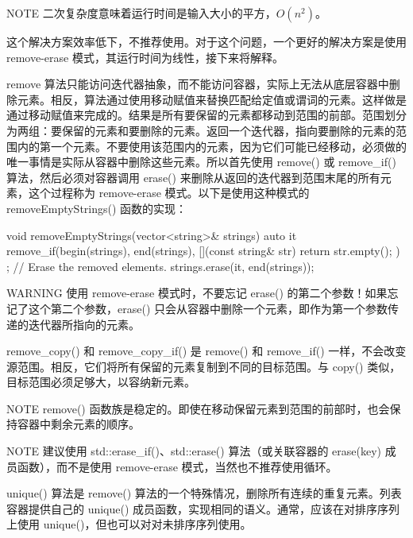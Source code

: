 \begin{myNotic}{NOTE}
二次复杂度意味着运行时间是输入大小的平方，$O(n^2)$。
\end{myNotic}

这个解决方案效率低下，不推荐使用。对于这个问题，一个更好的解决方案是使用 remove-erase 模式，其运行时间为线性，接下来将解释。

remove 算法只能访问迭代器抽象，而不能访问容器，实际上无法从底层容器中删除元素。相反，算法通过使用移动赋值来替换匹配给定值或谓词的元素。这样做是通过移动赋值来完成的。结果是所有要保留的元素都移动到范围的前部。范围划分为两组：要保留的元素和要删除的元素。返回一个迭代器，指向要删除的元素的范围内的第一个元素。不要使用该范围内的元素，因为它们可能已经移动，必须做的唯一事情是实际从容器中删除这些元素。所以首先使用 remove() 或 remove\_if() 算法，然后必须对容器调用 erase() 来删除从返回的迭代器到范围末尾的所有元素，这个过程称为 remove-erase 模式。以下是使用这种模式的 removeEmptyStrings() 函数的实现：

\begin{cpp}
void removeEmptyStrings(vector<string>& strings)
{
    auto it { remove_if(begin(strings), end(strings),
        [](const string& str){ return str.empty(); }) };
    // Erase the removed elements.
    strings.erase(it, end(strings));
}
\end{cpp}

\begin{myWarning}{WARNING}
使用 remove-erase 模式时，不要忘记 erase() 的第二个参数！如果忘记了这个第二个参数，erase() 只会从容器中删除一个元素，即作为第一个参数传递的迭代器所指向的元素。
\end{myWarning}

remove\_copy() 和 remove\_copy\_if() 是 remove() 和 remove\_if() 一样，不会改变源范围。相反，它们将所有保留的元素复制到不同的目标范围。与 copy() 类似，目标范围必须足够大，以容纳新元素。

\begin{myNotic}{NOTE}
remove() 函数族是稳定的。即使在移动保留元素到范围的前部时，也会保持容器中剩余元素的顺序。
\end{myNotic}

\begin{myNotic}{NOTE}
建议使用 std::erase\_if()、std::erase() 算法（或关联容器的 erase(key) 成员函数），而不是使用 remove-erase 模式，当然也不推荐使用循环。
\end{myNotic}


unique() 算法是 remove() 算法的一个特殊情况，删除所有连续的重复元素。列表容器提供自己的 unique() 成员函数，实现相同的语义。通常，应该在对排序序列上使用 unique()，但也可以对对未排序序列使用。

